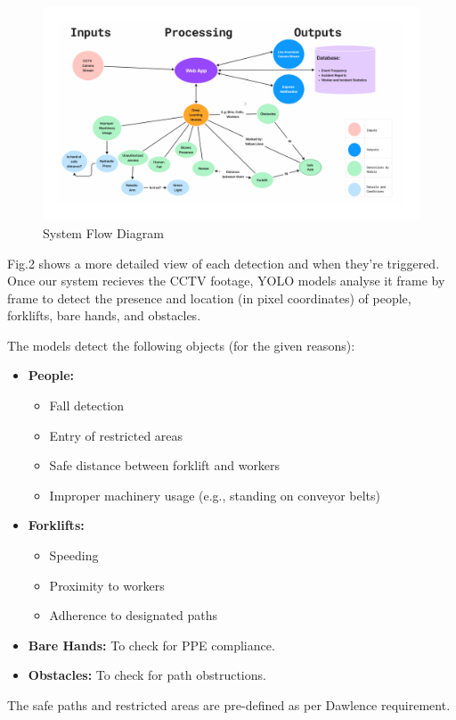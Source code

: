 \documentclass[12pt]{article}
\begin{document}
\begin{figure}[h]
    \centering
    \includegraphics[width=\textwidth]{system_flow.png}
    \caption{System Flow Diagram}
\end{figure}
Fig.2 shows a more detailed view of each detection and when they're triggered. 
Once our system recieves the CCTV footage, YOLO models analyse it frame by frame
to detect the presence and location (in pixel coordinates) of people, forklifts,
bare hands, and obstacles. 

The models detect the following objects (for the given reasons):
\begin{itemize}
    \item \textbf{People:} 
    \begin{itemize}
        \item Fall detection
        \item Entry of restricted areas
        \item Safe distance between forklift and workers
        \item Improper machinery usage (e.g., standing on conveyor belts)
    \end{itemize}
    \item \textbf{Forklifts:}
    \begin{itemize}
        \item Speeding
        \item Proximity to workers
        \item Adherence to designated paths
    \end{itemize}
    \item \textbf{Bare Hands:} To check for PPE compliance.
    \item \textbf{Obstacles:} To check for path obstructions.

\end{itemize}
The safe paths and restricted areas are pre-defined as per Dawlence requirement. 
\end{document}
